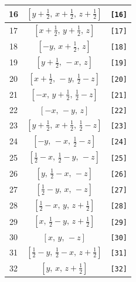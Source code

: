 \documentclass[fleqn,8pt]{jsarticle}
\begin{document}
\begin{longtable}{ccc}
16 & $\left[ y + \frac{1}{2},\, x + \frac{1}{2},\, z + \frac{1}{2} \right]$ & {\tt [16]} \\ \hline
17 & $\left[ x + \frac{1}{2},\, y + \frac{1}{2},\, z \right]$ & {\tt [17]} \\ \hline
18 & $\left[ - y,\, x + \frac{1}{2},\, z \right]$ & {\tt [18]} \\ \hline
19 & $\left[ y + \frac{1}{2},\, - x,\, z \right]$ & {\tt [19]} \\ \hline
20 & $\left[ x + \frac{1}{2},\, - y,\, \frac{1}{2} - z \right]$ & {\tt [20]} \\ \hline
21 & $\left[ - x,\, y + \frac{1}{2},\, \frac{1}{2} - z \right]$ & {\tt [21]} \\ \hline
22 & $\left[ - x,\, - y,\, z \right]$ & {\tt [22]} \\ \hline
23 & $\left[ y + \frac{1}{2},\, x + \frac{1}{2},\, \frac{1}{2} - z \right]$ & {\tt [23]} \\ \hline
24 & $\left[ - y,\, - x,\, \frac{1}{2} - z \right]$ & {\tt [24]} \\ \hline
25 & $\left[ \frac{1}{2} - x,\, \frac{1}{2} - y,\, - z \right]$ & {\tt [25]} \\ \hline
26 & $\left[ y,\, \frac{1}{2} - x,\, - z \right]$ & {\tt [26]} \\ \hline
27 & $\left[ \frac{1}{2} - y,\, x,\, - z \right]$ & {\tt [27]} \\ \hline
28 & $\left[ \frac{1}{2} - x,\, y,\, z + \frac{1}{2} \right]$ & {\tt [28]} \\ \hline
29 & $\left[ x,\, \frac{1}{2} - y,\, z + \frac{1}{2} \right]$ & {\tt [29]} \\ \hline
30 & $\left[ x,\, y,\, - z \right]$ & {\tt [30]} \\ \hline
31 & $\left[ \frac{1}{2} - y,\, \frac{1}{2} - x,\, z + \frac{1}{2} \right]$ & {\tt [31]} \\ \hline
32 & $\left[ y,\, x,\, z + \frac{1}{2} \right]$ & {\tt [32]} \\
\end{longtable}
\end{document}
